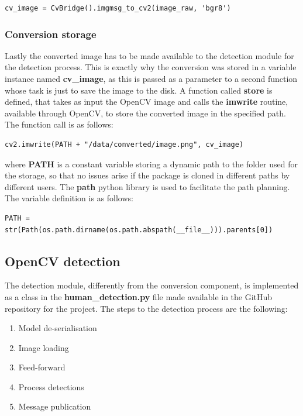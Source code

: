 \begin{lstlisting}
cv_image = CvBridge().imgmsg_to_cv2(image_raw, 'bgr8')
\end{lstlisting}

\subsubsection{Conversion storage}

Lastly the converted image has to be made available to the detection module for the detection process. This is exactly why the conversion was stored in a variable instance named \textbf{cv\_image}, as this is passed as a parameter to a second function whose task is just to save the image to the disk. A function called \textbf{store} is defined, that takes as input the OpenCV image and calls the \textbf{imwrite} routine, available through OpenCV, to store the converted image in the specified path. The function call is as follows:

\begin{lstlisting}
cv2.imwrite(PATH + "/data/converted/image.png", cv_image)
\end{lstlisting}

where \textbf{PATH} is a constant variable storing a dynamic path to the folder used for the storage, so that no issues arise if the package is cloned in different paths by different users. The \textbf{path} python library is used to facilitate the path planning. The variable definition is as follows:

\begin{lstlisting}
PATH = str(Path(os.path.dirname(os.path.abspath(__file__))).parents[0])
\end{lstlisting}

\subsection{OpenCV detection}

The detection module, differently from the conversion component, is implemented as a class in the \textbf{human\_detection.py} file made available in the GitHub repository for the project. The steps to the detection process are the following:

\begin{enumerate}
  \item Model de-serialisation
  \item Image loading
  \item Feed-forward
  \item Process detections
  \item Message publication
\end{enumerate}

